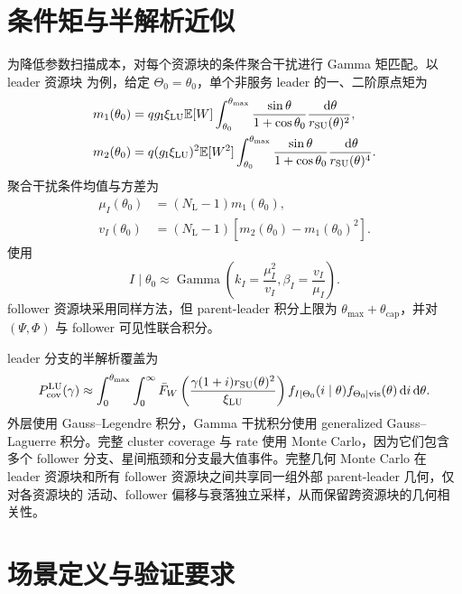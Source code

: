 \documentclass[UTF8,a4paper,11pt]{ctexart}
\newcommand{\E}{\mathbb E}
\newcommand{\dd}{\,\mathrm d}
\newcommand{\NL}{N_{\mathrm L}}
\newcommand{\thetam}{\theta_{\max}}
\newcommand{\thetac}{\theta_{\mathrm{cap}}}
\begin{document}
\section{条件矩与半解析近似}

为降低参数扫描成本，对每个资源块的条件聚合干扰进行 Gamma 矩匹配。以 leader 资源块
为例，给定 $\Theta_0=\theta_0$，单个非服务 leader 的一、二阶原点矩为
\begin{align}
 m_1(\theta_0)
 &=
 qg_{\rm I}\xi_{\rm LU}\E[W]
 \int_{\theta_0}^{\thetam}
 \frac{\sin\theta}{1+\cos\theta_0}
 \frac{\dd\theta}{r_{\rm SU}(\theta)^2},\\
 m_2(\theta_0)
 &=
 q(g_{\rm I}\xi_{\rm LU})^2\E[W^2]
 \int_{\theta_0}^{\thetam}
 \frac{\sin\theta}{1+\cos\theta_0}
 \frac{\dd\theta}{r_{\rm SU}(\theta)^4}.
\end{align}
聚合干扰条件均值与方差为
\begin{align}
 \mu_I(\theta_0)&=(\NL-1)m_1(\theta_0),\\
 v_I(\theta_0)&=(\NL-1)\left[m_2(\theta_0)-m_1(\theta_0)^2\right].
\end{align}
使用
\begin{equation}
 I\mid\theta_0
 \approx
 \operatorname{Gamma}
 \left(
 k_I=\frac{\mu_I^2}{v_I},
 \beta_I=\frac{v_I}{\mu_I}
 \right).
\end{equation}
follower 资源块采用同样方法，但 parent-leader 积分上限为
$\thetam+\thetac$，并对 $(\Psi,\Phi)$ 与 follower 可见性联合积分。

leader 分支的半解析覆盖为
\begin{equation}
\begin{split}
 P_{\rm cov}^{\rm LU}(\gamma)
 \approx
 \int_0^{\thetam}\int_0^\infty
 \bar F_W
 \left(
 \frac{\gamma(1+i)r_{\rm SU}(\theta)^2}{\xi_{\rm LU}}
 \right)
 f_{I\mid\Theta_0}(i\mid\theta)
 f_{\Theta_0\mid{\rm vis}}(\theta)
 \dd i\dd\theta.
\end{split}
\label{eq:semi-coverage}
\end{equation}
外层使用 Gauss--Legendre 积分，Gamma 干扰积分使用 generalized
Gauss--Laguerre 积分。完整 cluster coverage 与 rate 使用 Monte Carlo，因为它们包含
多个 follower 分支、星间瓶颈和分支最大值事件。完整几何 Monte Carlo 在 leader
资源块和所有 follower 资源块之间共享同一组外部 parent-leader 几何，仅对各资源块的
活动、follower 偏移与衰落独立采样，从而保留跨资源块的几何相关性。

\section{场景定义与验证要求}
\end{document}
